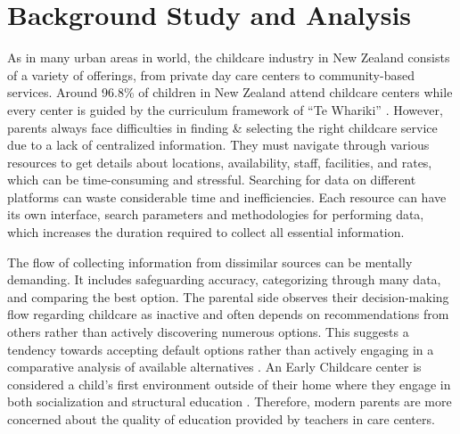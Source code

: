 
\section{Background Study and Analysis}
As in many urban areas in world, the childcare industry in New Zealand consists of a variety of offerings, from private day care centers to community-based services. Around 96.8\% of children in New Zealand attend childcare centers while every center is guided by the curriculum framework of “Te Whariki” \cite{ministryofeducation_2023}. However, parents always face difficulties in finding \& selecting the right childcare service due to a lack of centralized information. They must navigate through various resources to get details about locations, availability, staff, facilities, and rates, which can be time-consuming and stressful. Searching for data on different platforms can waste considerable time and inefficiencies. Each resource can have its own interface, search parameters and methodologies for performing data, which increases the duration required to collect all essential information. 

The flow of collecting information from dissimilar sources can be mentally demanding. It includes safeguarding accuracy, categorizing through many data, and comparing the best option. The parental side observes their decision-making flow regarding childcare as inactive and often depends on recommendations from others rather than actively discovering numerous options. This suggests a tendency towards accepting default options rather than actively engaging in a comparative analysis of available alternatives \cite{Barraclough_Smith_1996}. An Early Childcare center is considered a child’s first environment outside of their home where they engage in both socialization and structural education \cite{Fenech_Sumsion_2007}. Therefore, modern parents are more concerned about the quality of education provided by teachers in care centers.